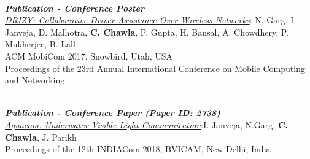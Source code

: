 \documentclass[11pt]{res} %
\newcommand{\titlegap}{5pt} %
\newcommand{\sectgap}{0.05in} %
\begin{document}
\begin{resume}
\\
\textbf{\textit{Publication - Conference Poster}}\\ \textcolor{blue}{\textit{\href{https://dl.acm.org/doi/10.1145/3117811.3131255}{DRIZY: Collaborative Driver Assistance Over Wireless Networks}}}:\hspace{0.3cm} N. Garg, I. Janveja, D. Malhotra, \textbf{C. Chawla}, P. Gupta, H. Bansal, A. Chowdhery, P. Mukherjee, B. Lall\\
ACM MobiCom 2017, Snowbird, Utah, USA
\\Proceedings of the 23rd Annual International Conference on Mobile Computing and Networking

\\
\textbf{\textit{Publication - Conference Paper (Paper ID: 2738)}}\\ \textcolor{blue}{\textit{\href{http://bvicam.in/INDIACom/news/INDIACom\%202018\%20Proceedings/Main/papers.html}{Aquacom: Underwater Visible Light Communication}}}:\hfill I. Janveja, N.Garg, \textbf{C. Chawla}, J. Parikh\\
Proceedings of the 12th INDIACom 2018, BVICAM, New Delhi, India

\vspace{0.1in} 
\hline











\end{resume}
\end{document}

